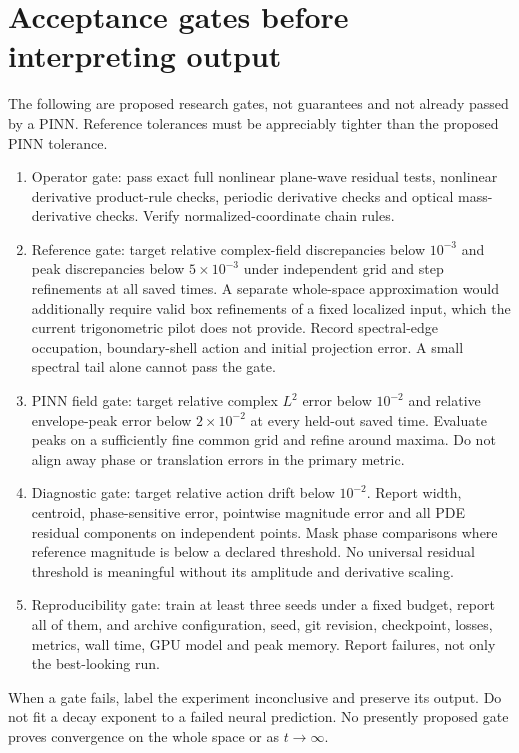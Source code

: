 \documentclass[11pt]{article}
\begin{document}
\section{Acceptance gates before interpreting output}
The following are proposed research gates, not guarantees and not already passed by a PINN. Reference tolerances must be appreciably tighter than the proposed PINN tolerance.
\begin{enumerate}
\item Operator gate: pass exact full nonlinear plane-wave residual tests, nonlinear derivative product-rule checks, periodic derivative checks and optical mass-derivative checks. Verify normalized-coordinate chain rules.
\item Reference gate: target relative complex-field discrepancies below $10^{-3}$ and peak discrepancies below $5\times10^{-3}$ under independent grid and step refinements at all saved times. A separate whole-space approximation would additionally require valid box refinements of a fixed localized input, which the current trigonometric pilot does not provide. Record spectral-edge occupation, boundary-shell action and initial projection error. A small spectral tail alone cannot pass the gate.
\item PINN field gate: target relative complex $L^2$ error below $10^{-2}$ and relative envelope-peak error below $2\times10^{-2}$ at every held-out saved time. Evaluate peaks on a sufficiently fine common grid and refine around maxima. Do not align away phase or translation errors in the primary metric.
\item Diagnostic gate: target relative action drift below $10^{-2}$. Report width, centroid, phase-sensitive error, pointwise magnitude error and all PDE residual components on independent points. Mask phase comparisons where reference magnitude is below a declared threshold. No universal residual threshold is meaningful without its amplitude and derivative scaling.
\item Reproducibility gate: train at least three seeds under a fixed budget, report all of them, and archive configuration, seed, git revision, checkpoint, losses, metrics, wall time, GPU model and peak memory. Report failures, not only the best-looking run.
\end{enumerate}
When a gate fails, label the experiment inconclusive and preserve its output. Do not fit a decay exponent to a failed neural prediction. No presently proposed gate proves convergence on the whole space or as $t\to\infty$.
\end{document}
